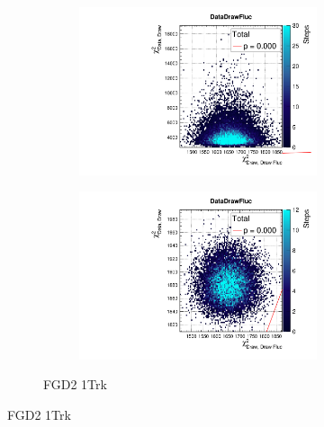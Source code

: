 \begin{figure}[h]
\begin{subfigure}[t]{\textwidth}
\begin{subfigure}[t]{0.24\textwidth}
\includegraphics[width=\textwidth, trim={0mm 0mm 0mm 8mm}, clip,page=83]{figures/mach3/data/priorpred/2017b_NewDet_3Xsec_4Det_5Flux_NewXSecTune_Data_merge_PriorPred_procs}
\end{subfigure}
	\begin{subfigure}[t]{0.24\textwidth}
		\includegraphics[width=\textwidth, trim={0mm 0mm 0mm 8mm}, clip,page=83]{figures/mach3/data/postpred/2017b_NewData_NewDet_UpdXsecStep_2Xsec_4Det_5Flux_0_PostPred_procs}
	\end{subfigure}
\caption{FGD2 1Trk}
\end{subfigure}
	

\end{figure}
